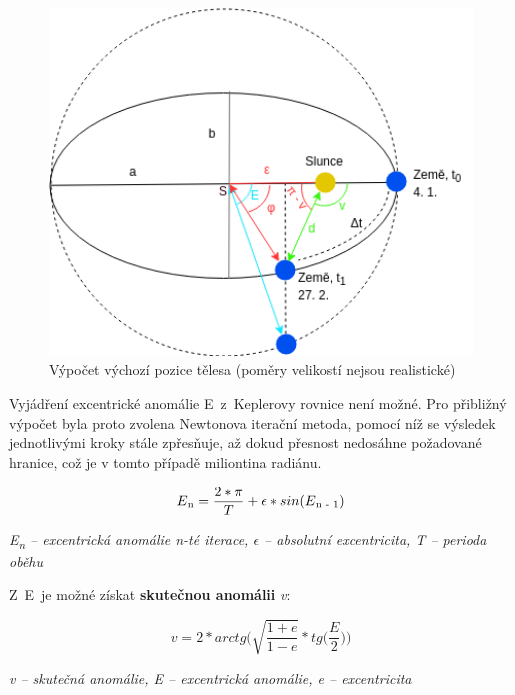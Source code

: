 \documentclass[a4paper,12pt]{article}
\begin{document}
\begin{figure}[H]
\begin{center}
\includegraphics[width=350pt]{Images/Initial.png}
\caption[Výpočet výchozí pozice tělesa]{Výpočet výchozí pozice tělesa (poměry velikostí nejsou realistické) \footnotemark[1]}
\end{center}
\end{figure}


\vspace*{-0.5cm}
Vyjádření excentrické anomálie E~z~Keplerovy rovnice není možné. Pro přibližný výpočet byla proto zvolena Newtonova iterační metoda, pomocí níž se výsledek jednotlivými kroky stále zpřesňuje, až dokud přesnost nedosáhne požadované hranice, což je v tomto případě miliontina radiánu.

\vspace*{-0.5cm}
$$E\textsubscript{n} = \frac{2 * \pi}{T} + \epsilon * sin(E\textsubscript{n - 1})$$
\begin{center}
\textit{E\textsubscript{n} -- excentrická anomálie n-té iterace, $\epsilon$ -- absolutní excentricita, T -- perioda oběhu}~\cite{michalrepik}
\end{center}

Z~E~je možné získat \textbf{skutečnou anomálii} \textit{v}:

\vspace*{-0.5cm}
$$v = 2 * arctg\Bigg(\sqrt{\frac{1 + e}{1 - e}} * tg\bigg(\frac{E}{2}\bigg)\Bigg)$$
\begin{center}
\textit{v -- skutečná anomálie, E -- excentrická anomálie, e -- excentricita}~\cite{michalrepik}
\end{center}
\end{document}
